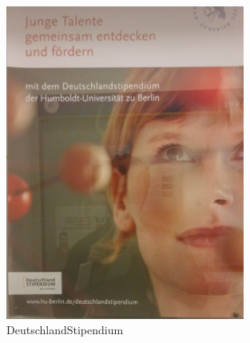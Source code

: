\documentclass[]{scrartcl}
\begin{document}
\begin{figure}[h]
	\centering
	\includegraphics[width=0.7\textwidth]{images/studienorga/stip.jpg}
	\caption{DeutschlandStipendium}
	\label{fig:strss}
\end{figure}
\end{document}
